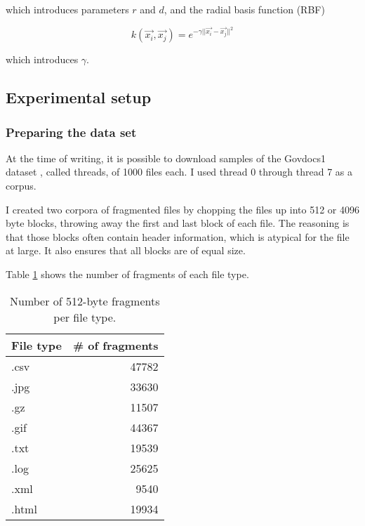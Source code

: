 which introduces parameters $r$ and $d$, and the radial basis
function (RBF)

$$ k(\vec{x_{i}}, \vec{x_{j}}) = e^{-\gamma ||\vec{x_{i}}
- \vec{x_{j}}||^{2}} $$

which introduces $\gamma$.

\subsection{Experimental setup}

\subsubsection{Preparing the data set}


At the time of writing, it is possible to download samples of the Govdocs1
dataset \cite{Garfinkel2009}, called threads, of 1000 files each. I used
thread 0 through thread 7 as a corpus.

I created two corpora of fragmented files by chopping the files up into 512 or
4096 byte blocks, throwing away the first and last block of each file. The
     reasoning is that those blocks often contain header information, which is
     atypical for the file at large. It also ensures that all blocks are of
     equal size.

Table \ref{table:number_of_fragments} shows the number of fragments of each file type.

\begin{table}
\begin{tabular}{lr}
\hline
 File type   &   \# of fragments \\
\hline
 .csv        &                 47782 \\
 .jpg        &                 33630 \\
 .gz         &                 11507 \\
 .gif        &                 44367 \\
 .txt        &                 19539 \\
 .log        &                 25625 \\
 .xml        &                 9540  \\
 .html       &                 19934  \\
\hline
\end{tabular}
\caption{Number of 512-byte fragments per file type.}
\label{table:number_of_fragments}
\end{table}



